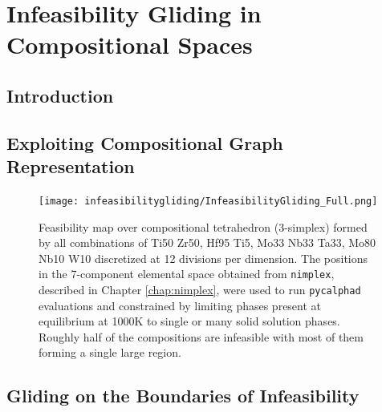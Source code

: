 \chapter{Infeasibility Gliding in Compositional Spaces} \label{chap:infeasibilitygliding}


\section{Introduction} \label{infglide:sec:intro}

\todo



\section{Exploiting Compositional Graph Representation} \label{infglide:sec:exploitgraph}

\todo

\begin{figure}[H]
    \centering
    \texttt{[image: infeasibilitygliding/InfeasibilityGliding\_Full.png]}
    \caption{Feasibility map over compositional tetrahedron (3-simplex) formed by all combinations of Ti50 Zr50, Hf95 Ti5, Mo33 Nb33 Ta33, Mo80 Nb10 W10 discretized at 12 divisions per dimension. The positions in the 7-component elemental space obtained from \texttt{nimplex}, described in Chapter \ref{chap:nimplex}, were used to run \texttt{pycalphad} \cite{Otis2017Pycalphad:Python} evaluations and constrained by limiting phases present at equilibrium at 1000K to single or many solid solution phases. Roughly half of the compositions are infeasible with most of them forming a single large region.}
    \label{infeasibilitygliding:fig:fullcomputation}
\end{figure}



\section{Gliding on the Boundaries of Infeasibility} \label{infglide:sec:glide}

